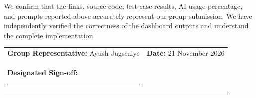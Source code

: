 \documentclass[11pt,a4paper]{article}
\begin{document}
\begin{tcolorbox}[colback=lightbg,colframe=bordergray,arc=3mm]
We confirm that the links, source code, test-case results, AI usage percentage, and prompts reported above accurately represent our group submission. We have independently verified the correctness of the dashboard outputs and understand the complete implementation.
\end{tcolorbox}

\vspace{0.6cm}
\noindent
\begin{tabularx}{\textwidth}{X r}
\textbf{Group Representative:} Ayush Jugseniye & \textbf{Date:} 21 November 2026 \\[0.8cm]
\textbf{Designated Sign-off:} \rule{6.5cm}{0.4pt} & \\
\end{tabularx}
\end{document}
